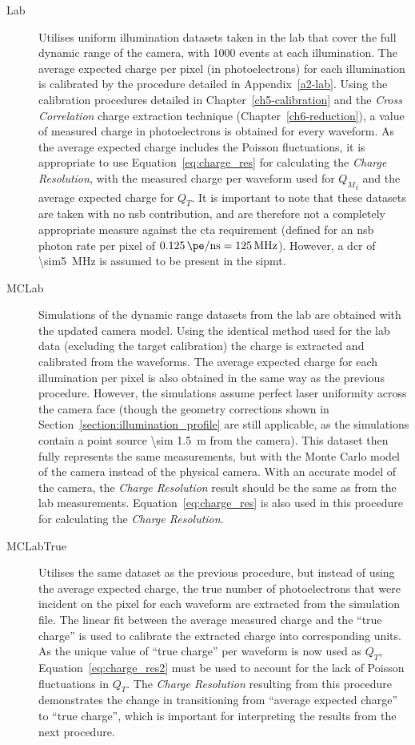 \begin{description}
\item [Lab] Utilises uniform illumination datasets taken in the lab that cover the full dynamic range of the camera, with 1000 events at each illumination. The average expected charge per pixel (in photoelectrons) for each illumination is calibrated by the procedure detailed in Appendix~\ref{a2-lab}. Using the calibration procedures detailed in Chapter~\ref{ch5-calibration} and the \textit{Cross Correlation} charge extraction technique (Chapter~\ref{ch6-reduction}), a value of measured charge in photoelectrons is obtained for every waveform. As the average expected charge includes the Poisson fluctuations, it is appropriate to use Equation~\ref{eq:charge_res} for calculating the \textit{Charge Resolution}, with the measured charge per waveform used for ${Q_M}_i$ and the average expected charge for $Q_T$. It is important to note that these datasets are taken with no \gls{nsb} contribution, and are therefore not a completely appropriate measure against the \gls{cta} requirement (defined for an \gls{nsb} photon rate per pixel of $\SI{0.125}{\pe/ns} = \SI{125}{MHz}$). However, a \gls{dcr} of \SI{\sim5}{MHz} is assumed to be present in the \gls{sipmt}.
\item [MCLab] Simulations of the dynamic range datasets from the lab are obtained with the updated  camera model. Using the identical method used for the lab data (excluding the \gls{target} calibration) the charge is extracted and calibrated from the waveforms. The average expected charge for each illumination per pixel is also obtained in the same way as the previous procedure. However, the simulations assume perfect laser uniformity across the camera face (though the geometry corrections shown in Section~\ref{section:illumination_profile} are still applicable, as the simulations contain a point source \SI{\sim 1.5}{m} from the camera). This dataset then fully represents the same measurements, but with the Monte Carlo model of the camera instead of the physical camera. With an accurate model of the camera, the \textit{Charge Resolution} result should be the same as from the lab measurements. Equation~\ref{eq:charge_res} is also used in this procedure for calculating the \textit{Charge Resolution}.
\item [MCLabTrue] Utilises the same dataset as the previous procedure, but instead of using the average expected charge, the true number of photoelectrons that were incident on the pixel for each waveform are extracted from the simulation file. The linear fit between the average measured charge and the ``true charge'' is used to calibrate the extracted charge into corresponding units. As the unique value of ``true charge'' per waveform is now used as $Q_T$, Equation~\ref{eq:charge_res2} must be used to account for the lack of Poisson fluctuations in $Q_T$. The \textit{Charge Resolution} resulting from this procedure demonstrates the change in transitioning from ``average expected charge'' to ``true charge'', which is important for interpreting the results from the next procedure.

\end{description}
